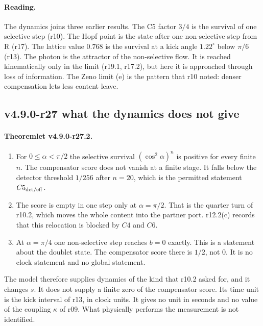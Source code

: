 \paragraph{Reading.}
The dynamics joins three earlier results.  The C5 factor \(3/4\) is the survival of one selective step (r10).  The Hopf point is the
state after one non-selective step from R (r17).  The lattice value \(0.768\) is the survival at a kick angle \(1.22^\circ\) below
\(\pi/6\) (r13).  The photon is the attractor of the non-selective flow.  It is reached kinematically only in the limit (r19.1, r17.2),
but here it is approached through loss of information.  The Zeno limit (e) is the pattern that r10 noted: denser compensation
lets less content leave.

\subsection*{v4.9.0-r27 what the dynamics does not give}
\label{subsec:v490-r27-limits}

\paragraph{Theoremlet v4.9.0-r27.2.}
\begin{enumerate}[leftmargin=2em]
\item[(a)] For \(0\le\alpha<\pi/2\) the selective survival \((\cos^2\alpha)^n\) is positive for every finite \(n\).  The compensator score
does not vanish at a finite stage.  It falls below the detector threshold \(1/256\) after \(n=20\), which is the permitted statement
\(C5_{\rm det/eff}\).
\item[(b)] The score is empty in one step only at \(\alpha=\pi/2\).  That is the quarter turn of r10.2, which moves the whole content
into the partner port.  r12.2(c) records that this relocation is blocked by \(C4\) and \(C6\).
\item[(c)] At \(\alpha=\pi/4\) one non-selective step reaches \(b=0\) exactly.  This is a statement about the doublet state.  The
compensator score there is \(1/2\), not \(0\).  It is no clock statement and no global statement.
\end{enumerate}
The model therefore supplies dynamics of the kind that r10.2 asked for, and it changes \(s\).  It does not supply a finite zero of
the compensator score.  Its time unit is the kick interval of r13, in clock units.  It gives no unit in seconds and no value of the
coupling \(\kappa\) of r09.  What physically performs the measurement is not identified.

